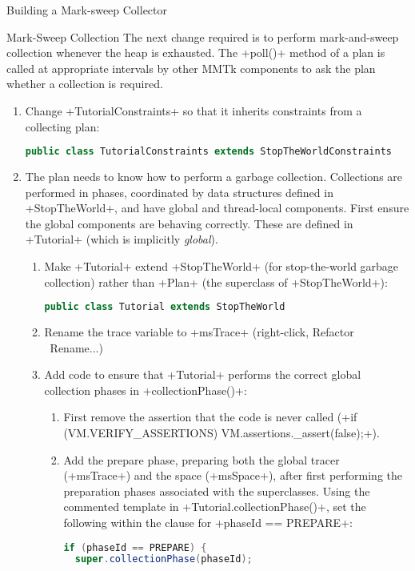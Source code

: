\begin{section}{Building a Mark-sweep Collector}
\begin{subsection}{Mark-Sweep Collection}
The next change required is to perform mark-and-sweep collection whenever the heap is exhausted. The \spverb+poll()+ method of a plan is called at appropriate intervals by other MMTk components to ask the plan whether a collection is required.
\begin{enumerate}
  \item Change \spverb+TutorialConstraints+ so that it inherits constraints from a collecting plan:
    \begin{lstlisting}[language=Java]
public class TutorialConstraints extends StopTheWorldConstraints
    \end{lstlisting}
  \item The plan needs to know how to perform a garbage collection. Collections are performed in phases, coordinated by data structures defined in \spverb+StopTheWorld+, and have global and thread-local components. First ensure the global components are behaving correctly. These are defined in \spverb+Tutorial+ (which is implicitly \textit{global}).
    \begin{enumerate}
      \item Make \spverb+Tutorial+ extend \spverb+StopTheWorld+ (for stop-the-world garbage collection) rather than \spverb+Plan+ (the superclass of \spverb+StopTheWorld+):
        \begin{lstlisting}[language=Java]
public class Tutorial extends StopTheWorld
        \end{lstlisting}
       \item Rename the trace variable to \spverb+msTrace+ (right-click, Refactor \textrightarrow\ Rename...)
       \item Add code to ensure that \spverb+Tutorial+ performs the correct global collection phases in \spverb+collectionPhase()+:
         \begin{enumerate}
           \item First remove the assertion that the code is never called (\spverb+if (VM.VERIFY_ASSERTIONS) VM.assertions._assert(false);+).
           \item Add the prepare phase, preparing both the global tracer (\spverb+msTrace+) and the space (\spverb+msSpace+), after first performing the preparation phases associated with the superclasses. Using the commented template in \spverb+Tutorial.collectionPhase()+, set the following within the clause for \spverb+phaseId == PREPARE+:
             \begin{lstlisting}[language=Java]
if (phaseId == PREPARE) {
  super.collectionPhase(phaseId);

\end{lstlisting}
\end{enumerate}
\end{enumerate}
\end{enumerate}
\end{subsection}
\end{section}
